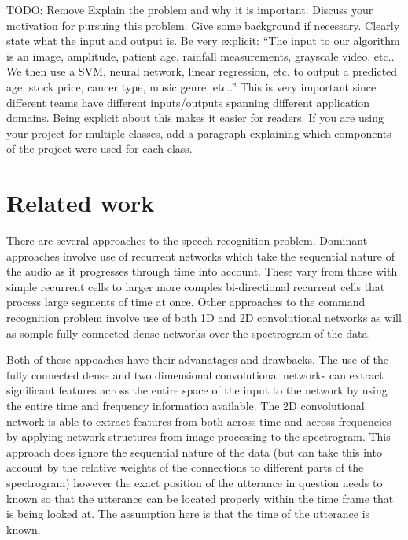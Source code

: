 \documentclass{article}
\begin{document}
TODO: Remove
Explain the problem and why it is important. Discuss your motivation for pursuing this
problem. Give some background if necessary. Clearly state what the input and output
is. Be very explicit: “The input to our algorithm is an {image, amplitude, patient age,
rainfall measurements, grayscale video, etc.}. We then use a {SVM, neural network, linear
regression, etc.} to output a predicted {age, stock price, cancer type, music genre, etc.}.”
This is very important since different teams have different inputs/outputs spanning different
application domains. Being explicit about this makes it easier for readers. If you are using
your project for multiple classes, add a paragraph explaining which components of the
project were used for each class.

\section{Related work}
There are several approaches to the speech recognition
problem. Dominant approaches involve use of recurrent networks which
take the sequential nature of the audio as it progresses through time
into account. These vary from those with simple recurrent cells to
larger more comples bi-directional recurrent cells that process large
segments of time at once. Other approaches to the command recognition
problem involve use of both 1D and 2D convolutional networks as will
as somple fully connected dense networks over the spectrogram of the
data.

Both of these appoaches have their advanatages and drawbacks. The use
of the fully connected dense and two dimensional convolutional
networks can extract significant features across the entire space of
the input to the network by using the entire time and frequency
information available. The 2D convolutional network is able to extract
features from both across time and across frequencies by applying
network structures from image processing to the spectrogram. This
approach does ignore the sequential nature of the data (but can take this
into account by the relative weights of the connections to different
parts of the spectrogram) however the exact position of the utterance
in question needs to known so that the utterance can be located
properly within the time frame that is being looked at. The assumption
here is that the time of the utterance is known.
\end{document}
